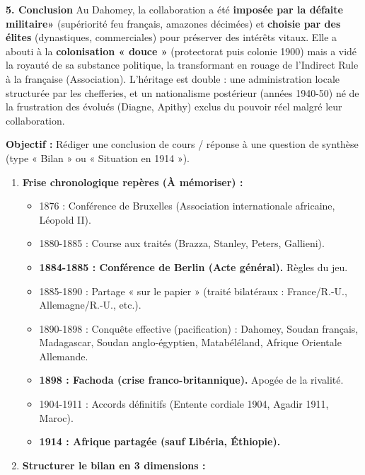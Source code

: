 \documentclass[11pt]{article}
\newcommand{\cle}[1]{{\popxbold\color{popdark}#1}}
\begin{document}
\begin{exoresolu}
\textbf{5. Conclusion}
Au Dahomey, la collaboration a été \textbf{imposée par la défaite militaire»} (supériorité feu français, amazones décimées) et \textbf{choisie par des élites} (dynastiques, commerciales) pour préserver des intérêts vitaux. Elle a abouti à la \textbf{colonisation « douce »} (protectorat puis colonie 1900) mais a vidé la royauté de sa substance politique, la transformant en rouage de l'\cle{Indirect Rule à la française} (Association). L'héritage est double : une administration locale structurée par les chefferies, et un nationalisme postérieur (années 1940-50) né de la frustration des \cle{évolués} (Diagne, Apithy) exclus du pouvoir réel malgré leur collaboration.
\end{exoresolu}

\begin{methode}
\textbf{Objectif :} Rédiger une conclusion de cours / réponse à une question de synthèse (type « Bilan » ou « Situation en 1914 »).
\begin{enumerate}
    \item \textbf{Frise chronologique repères (À mémoriser) :}
        \begin{itemize}
            \item 1876 : Conférence de Bruxelles (Association internationale africaine, Léopold II).
            \item 1880-1885 : Course aux traités (Brazza, Stanley, Peters, Gallieni).
            \item \textbf{1884-1885 : Conférence de Berlin (Acte général).} Règles du jeu.
            \item 1885-1890 : Partage « sur le papier » (traité bilatéraux : France/R.-U., Allemagne/R.-U., etc.).
            \item 1890-1898 : Conquête effective (pacification) : Dahomey, Soudan français, Madagascar, Soudan anglo-égyptien, Matabéléland, Afrique Orientale Allemande.
            \item \textbf{1898 : Fachoda (crise franco-britannique).} Apogée de la rivalité.
            \item 1904-1911 : Accords définitifs (Entente cordiale 1904, Agadir 1911, Maroc).
            \item \textbf{1914 : Afrique partagée (sauf Libéria, Éthiopie).}
        \end{itemize}
    \item \textbf{Structurer le bilan en 3 dimensions :}

\end{enumerate}
\end{methode}
\end{document}
